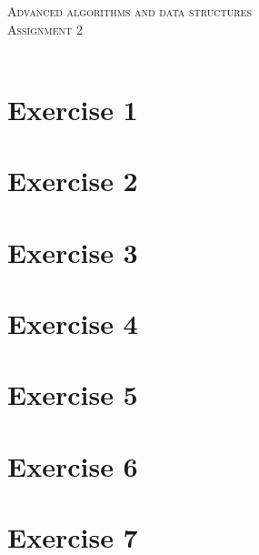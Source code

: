 \documentclass{article}
\begin{document}
\begin{center}
    \textsc{\Large Advanced algorithms and data structures}\\[0.5cm]
    \textsc{\large Assignment 2}\\[0.5cm]
    \textsc{\large }\\[0.5cm]
    \vspace{1 cm}
\end{center}

\section*{Exercise 1}
    
    
    \newpage

\section*{Exercise 2}
    

\section*{Exercise 3}
    
    
    \newpage

\section*{Exercise 4}
    
    
    
    \newpage

\section*{Exercise 5}
    

\section*{Exercise 6}
    

\section*{Exercise 7}
    
\end{document}
